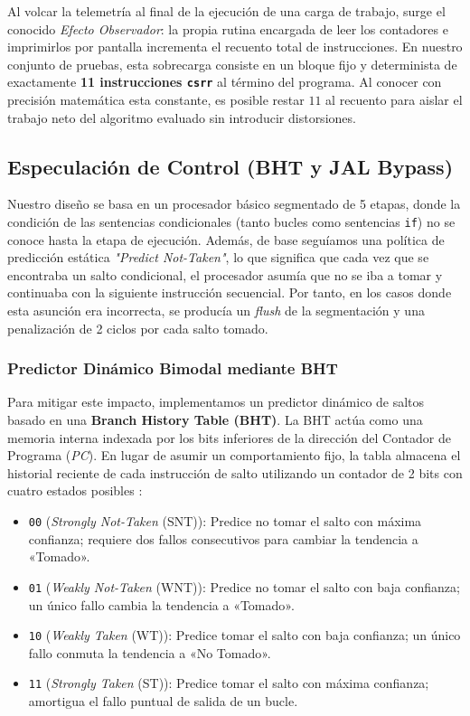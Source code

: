 \documentclass[10pt,a4paper]{article}
\begin{document}
Al volcar la telemetría al final de la ejecución de una carga de trabajo, surge el conocido \textit{Efecto Observador}: la propia rutina encargada de leer 
los contadores e imprimirlos por pantalla incrementa el recuento total de instrucciones. En nuestro conjunto de pruebas, esta sobrecarga consiste en un 
bloque fijo y determinista de exactamente \textbf{11 instrucciones \texttt{csrr}} al término del programa. Al conocer con precisión matemática esta constante, 
es posible restar $11$ al recuento para aislar el trabajo neto del algoritmo evaluado sin introducir distorsiones.


\subsection{Especulación de Control (BHT y JAL Bypass)}
Nuestro diseño se basa en un procesador básico segmentado de 5 etapas, donde la condición de las sentencias condicionales (tanto bucles como sentencias
\texttt{if}) no se conoce hasta la etapa de ejecución. Además, de base seguíamos una política de predicción estática \textit{"Predict Not-Taken"}, lo que
significa que cada vez que se encontraba un salto condicional, el procesador asumía que no se iba a tomar y continuaba con la siguiente instrucción secuencial.
Por tanto, en los casos donde esta asunción era incorrecta, se producía un \textit{flush} de la segmentación y una penalización de 2 ciclos por cada salto tomado.

\subsubsection{Predictor Dinámico Bimodal mediante BHT}
Para mitigar este impacto, implementamos un predictor dinámico de saltos basado en una \textbf{Branch History Table (BHT)}. La BHT actúa como una memoria
interna indexada por los bits inferiores de la dirección del Contador de Programa (\textit{PC}). En lugar de asumir un comportamiento fijo, la tabla almacena
el historial reciente de cada instrucción de salto utilizando un contador de 2 bits con cuatro estados posibles \cite{hennessy2025}:

\begin{itemize}
    \item \texttt{00} (\textit{Strongly Not-Taken} (SNT)): Predice no tomar el salto con máxima confianza; requiere dos fallos consecutivos para cambiar la tendencia 
    a «Tomado».
    \item \texttt{01} (\textit{Weakly Not-Taken} (WNT)): Predice no tomar el salto con baja confianza; un único fallo cambia la tendencia a «Tomado».
    \item \texttt{10} (\textit{Weakly Taken} (WT)): Predice tomar el salto con baja confianza; un único fallo conmuta la tendencia a «No Tomado».
    \item \texttt{11} (\textit{Strongly Taken} (ST)): Predice tomar el salto con máxima confianza; amortigua el fallo puntual de salida de un bucle.
\end{itemize}
\end{document}

